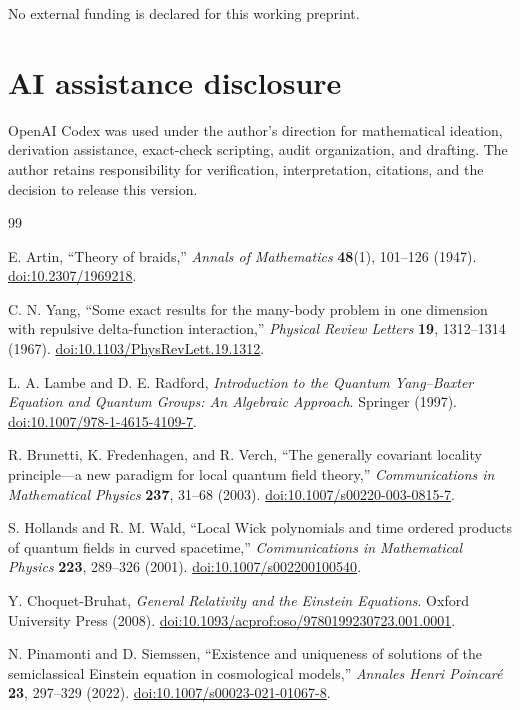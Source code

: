 \documentclass[11pt]{article}
\theoremstyle{definition}
\theoremstyle{remark}
\begin{document}
No external funding is declared for this working preprint.

\section*{AI assistance disclosure}

OpenAI Codex was used under the author's direction for mathematical ideation, derivation assistance, exact-check scripting, audit organization, and drafting. The author retains responsibility for verification, interpretation, citations, and the decision to release this version.

\begin{thebibliography}{99}

E. Artin, ``Theory of braids,'' \emph{Annals of Mathematics} \textbf{48}(1), 101--126 (1947). \href{https://doi.org/10.2307/1969218}{doi:10.2307/1969218}.

C. N. Yang, ``Some exact results for the many-body problem in one dimension with repulsive delta-function interaction,'' \emph{Physical Review Letters} \textbf{19}, 1312--1314 (1967). \href{https://doi.org/10.1103/PhysRevLett.19.1312}{doi:10.1103/PhysRevLett.19.1312}.

L. A. Lambe and D. E. Radford, \emph{Introduction to the Quantum Yang--Baxter Equation and Quantum Groups: An Algebraic Approach}. Springer (1997). \href{https://doi.org/10.1007/978-1-4615-4109-7}{doi:10.1007/978-1-4615-4109-7}.

R. Brunetti, K. Fredenhagen, and R. Verch, ``The generally covariant locality principle---a new paradigm for local quantum field theory,'' \emph{Communications in Mathematical Physics} \textbf{237}, 31--68 (2003). \href{https://doi.org/10.1007/s00220-003-0815-7}{doi:10.1007/s00220-003-0815-7}.

S. Hollands and R. M. Wald, ``Local Wick polynomials and time ordered products of quantum fields in curved spacetime,'' \emph{Communications in Mathematical Physics} \textbf{223}, 289--326 (2001). \href{https://doi.org/10.1007/s002200100540}{doi:10.1007/s002200100540}.

Y. Choquet-Bruhat, \emph{General Relativity and the Einstein Equations}. Oxford University Press (2008). \href{https://doi.org/10.1093/acprof:oso/9780199230723.001.0001}{doi:10.1093/acprof:oso/9780199230723.001.0001}.

N. Pinamonti and D. Siemssen, ``Existence and uniqueness of solutions of the semiclassical Einstein equation in cosmological models,'' \emph{Annales Henri Poincar\'e} \textbf{23}, 297--329 (2022). \href{https://doi.org/10.1007/s00023-021-01067-8}{doi:10.1007/s00023-021-01067-8}.


\end{thebibliography}
\end{document}
